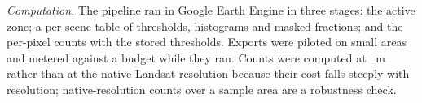 \emph{Computation.} The pipeline ran in Google Earth Engine\citep{gorelick2017} in three stages: the active zone; a per-scene table of thresholds, histograms and masked fractions; and the per-pixel counts with the stored thresholds. Exports were piloted on small areas and metered against a budget while they ran. Counts were computed at ~m rather than at the native Landsat resolution because their cost falls steeply with resolution; native-resolution counts over a sample area are a robustness check.
